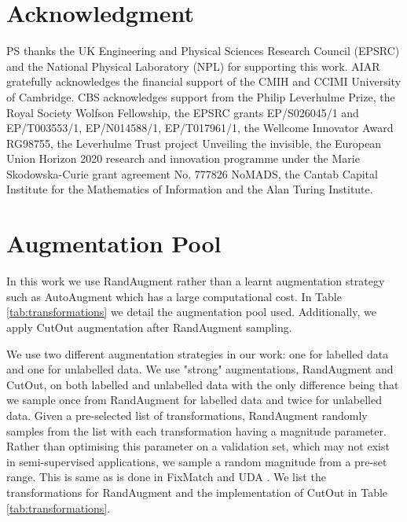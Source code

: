 \documentclass[journal]{IEEEtran}
\begin{document}
\section*{Acknowledgment}
PS thanks the UK Engineering and Physical Sciences Research Council (EPSRC) and the National Physical Laboratory (NPL) for supporting this work. AIAR gratefully acknowledges the financial support
of the CMIH and CCIMI University of Cambridge. CBS acknowledges support from the Philip Leverhulme Prize, the Royal Society Wolfson Fellowship, the EPSRC grants EP/S026045/1 and EP/T003553/1, EP/N014588/1, EP/T017961/1, the Wellcome Innovator Award RG98755, the Leverhulme Trust project Unveiling the invisible, the European Union Horizon 2020 research and innovation programme under the Marie Skodowska-Curie grant agreement No. 777826 NoMADS, the Cantab Capital Institute for the Mathematics of Information and the Alan Turing Institute.

\appendices

\vspace{-0.3cm}
\section{Augmentation Pool}
In this work we use RandAugment \cite{cubuk2020randaugment} rather than a learnt augmentation strategy such as AutoAugment \cite{cubuk2018autoaugment} which has a large computational cost. In Table \ref{tab:transformations} we detail the augmentation pool used. Additionally, we apply CutOut \cite{devries2017improved} augmentation after RandAugment sampling.

We use two different augmentation strategies in our work: one for labelled data and one for unlabelled data. We use "strong" augmentations, RandAugment and CutOut, on both labelled and unlabelled data with the only difference being that we sample once from RandAugment for labelled data and twice for unlabelled data. Given a pre-selected list of transformations, RandAugment randomly samples from the list with each transformation having a magnitude parameter. Rather than optimising this parameter on a validation set, which may not exist in semi-supervised applications, we sample a random magnitude from a pre-set range. This is same as is done in FixMatch \cite{sohn2020fixmatch} and UDA \cite{xie2019unsupervised}. We list the transformations for RandAugment and the implementation of CutOut in Table \ref{tab:transformations}. 
\end{document}
